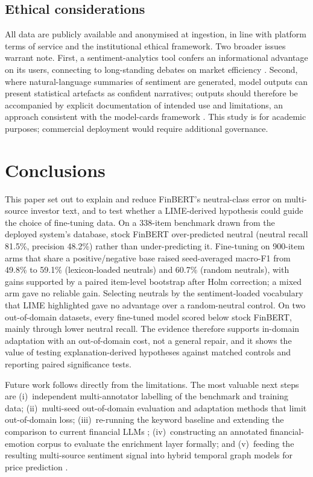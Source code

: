 \documentclass{aims}
\numberwithin{equation}{section}
\begin{document}
\subsection{Ethical considerations}
All data are publicly available and anonymised at ingestion, in line with platform
terms of service and the institutional ethical framework. Two broader issues warrant
note. First, a sentiment-analytics tool confers an informational advantage on its
users, connecting to long-standing debates on market efficiency \citep{fama1970}.
Second, where natural-language summaries of sentiment are generated, model outputs
can present statistical artefacts as confident narratives; outputs should therefore
be accompanied by explicit documentation of intended use and limitations, an approach
consistent with the model-cards framework \citep{mitchell2019}. This study is for
academic purposes; commercial deployment would require additional governance.

\section{Conclusions}\label{sec:conclusion}
This paper set out to explain and reduce FinBERT's neutral-class error on
multi-source investor text, and to test whether a LIME-derived hypothesis could guide
the choice of fine-tuning data. On a 338-item benchmark drawn from the deployed
system's database, stock FinBERT over-predicted neutral (neutral recall 81.5\%,
precision 48.2\%) rather than under-predicting it. Fine-tuning on 900-item arms that
share a positive/negative base raised seed-averaged macro-F1 from 49.8\% to 59.1\%
(lexicon-loaded neutrals) and 60.7\% (random neutrals), with gains supported by a
paired item-level bootstrap after Holm correction; a mixed arm gave no reliable gain.
Selecting neutrals by the sentiment-loaded vocabulary that LIME highlighted gave no
advantage over a random-neutral control. On two out-of-domain datasets, every
fine-tuned model scored below stock FinBERT, mainly through lower neutral recall.
The evidence therefore supports in-domain adaptation with an out-of-domain cost, not
a general repair, and it shows the value of testing explanation-derived hypotheses
against matched controls and reporting paired significance tests.

Future work follows directly from the limitations. The most valuable next steps are
(i)~independent multi-annotator labelling of the benchmark and training data;
(ii)~multi-seed out-of-domain evaluation and adaptation methods that limit
out-of-domain loss; (iii)~re-running the keyword baseline and extending the
comparison to current financial LLMs \citep{wu2023,fatouros2023}; (iv)~constructing
an annotated financial-emotion corpus to evaluate the enrichment layer formally; and
(v)~feeding the resulting multi-source sentiment signal into hybrid temporal graph
models for price prediction \citep{lynch2025}.
\end{document}
